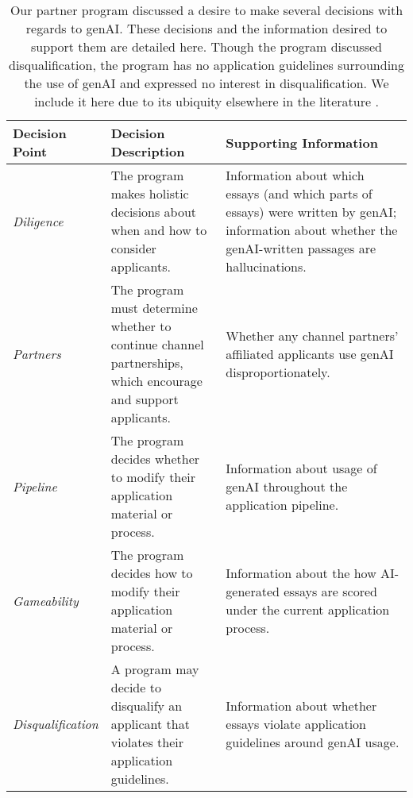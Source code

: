 \begin{table}[htbp]
  \centering
  \caption{Our partner program discussed a desire to make several decisions with regards to genAI. These decisions and the information desired to support them are detailed here. Though the program discussed disqualification, the program has no application guidelines surrounding the use of genAI and expressed no interest in disqualification. We include it here due to its ubiquity elsewhere in the literature \cite{liang_gpt_2023,mitchell_detectgpt_2023,tharindu_kumarage_stylometric_2023,kalpesh_krishna_paraphrasing_2023}.}
  \label{tab:decisions}
  \begin{tabular}{ p{0.2\linewidth}p{0.3\linewidth}p{0.5\linewidth}}
      \toprule
      Decision Point & Decision Description & Supporting Information \\
      \midrule
      \emph{Diligence} & The program makes holistic decisions about when and how to consider applicants. & Information about which essays (and which parts of essays) were written by genAI; information about whether the genAI-written passages are hallucinations. \\ 
      \emph{Partners} & The program must determine whether to continue channel partnerships, which encourage and support applicants. & Whether any channel partners' affiliated applicants use genAI disproportionately. \\
      \emph{Pipeline} & The program decides whether to modify their application material or process. & Information about usage of genAI throughout the application pipeline. \\
      \emph{Gameability} & The program decides how to modify their application material or process. & Information about the how AI-generated essays are scored under the current application process. \\
      \midrule
      \emph{Disqualification} & A program may decide to disqualify an applicant that violates their application guidelines. & Information about whether essays violate application guidelines around genAI usage. \\
      \bottomrule
  \end{tabular}
\end{table}


